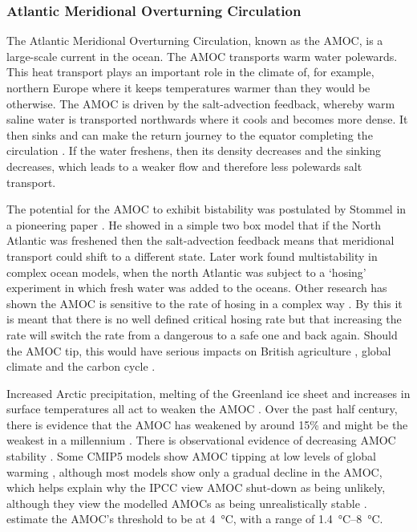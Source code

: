 \subsubsection{Atlantic Meridional Overturning Circulation}
The Atlantic Meridional Overturning Circulation, known as the AMOC, is a large-scale current in the ocean. The AMOC transports warm water polewards. This heat transport plays an
important role in the climate of, for example, northern Europe where it keeps temperatures warmer than they would be otherwise. The AMOC is driven by the salt-advection feedback, whereby
warm saline water is transported northwards where it cools and becomes more dense.  It then sinks and can make the return journey to the equator completing the circulation  \parencite{Dijkstra2011}.
If the water freshens, then its density decreases and the sinking decreases, which leads to a weaker flow and therefore less polewards salt transport.

The potential for the AMOC to exhibit bistability was postulated by Stommel in a pioneering paper \parencite{STOMMEL1961}. He showed in a simple two box model that if the North Atlantic was
freshened then the salt-advection feedback means that meridional transport could shift to a different state. Later work \parencite{Bryan1986,Manabe1988,Rahmstorf1995,Hawkins2011} found multistability in
complex ocean models, when the north Atlantic was subject to a `hosing' experiment in which fresh water was added to the oceans. Other research has shown the AMOC is sensitive to the
rate of hosing \parencite{Alkhayuon2019} in a complex way \parencite{Lohmann2021}. By this it is meant that there is no well defined critical
hosing rate but that increasing the rate will switch the rate from a dangerous to a safe one and back again. Should the AMOC tip, this would have serious impacts on British agriculture
\parencite{Ritchie2020a}, global climate \parencite{Jackson2015} and the carbon cycle \parencite{Bozbiyik2011}.


Increased Arctic precipitation, melting of the Greenland ice sheet and increases in surface temperatures all act to weaken the AMOC \parencite{ArmstrongMcKay2022}.
Over the past half century, there is evidence that the AMOC has weakened by around 15\% \parencite{Caesar2018} and might be the weakest in a millennium \parencite{Caesar2021}.
There is observational evidence of decreasing AMOC stability \parencite{Boers2021a,Michel2022,Ditlevsen2023}. Some CMIP5 models show AMOC tipping at low
levels of global warming \parencite{Drijfhout2015}, although most models show only a gradual decline in the AMOC, which helps explain why the IPCC view AMOC shut-down as
being unlikely, although they view the modelled AMOCs as being unrealistically stable \parencite{AR6}.~\cite{ArmstrongMcKay2022} estimate the AMOC's threshold to be at \SI{4}{\degreeCelsius},
with a range of \SIrange{1.4}{8}{\degreeCelsius}.

